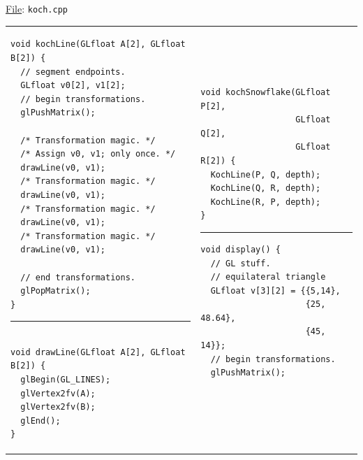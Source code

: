 \documentclass[addpoints]{exam}
\begin{document}
\begin{questions}
\underline{File}: {\tt koch.cpp}

\begin{table}
  \begin{tabular}{p{}|p{}}
    \begin{verbatim}
void kochLine(GLfloat A[2], GLfloat B[2]) {
  // segment endpoints.
  GLfloat v0[2], v1[2];
  // begin transformations.
  glPushMatrix();

  /* Transformation magic. */
  /* Assign v0, v1; only once. */    
  drawLine(v0, v1);
  /* Transformation magic. */
  drawLine(v0, v1);
  /* Transformation magic. */
  drawLine(v0, v1);
  /* Transformation magic. */
  drawLine(v0, v1);

  // end transformations.
  glPopMatrix();
}
\end{verbatim}
    \hrule
\begin{verbatim}

void drawLine(GLfloat A[2], GLfloat B[2]) {
  glBegin(GL_LINES);
  glVertex2fv(A);
  glVertex2fv(B);
  glEnd();
}
\end{verbatim}
    &
\begin{verbatim}
void kochSnowflake(GLfloat P[2],
                   GLfloat Q[2],
                   GLfloat R[2]) {
  KochLine(P, Q, depth);
  KochLine(Q, R, depth);
  KochLine(R, P, depth);
}
\end{verbatim}
      \hrule
\begin{verbatim}
void display() {
  // GL stuff.
  // equilateral triangle
  GLfloat v[3][2] = {{5,14},
                     {25, 48.64},
                     {45, 14}};
  // begin transformations.
  glPushMatrix();


\end{verbatim}
\end{tabular}
\end{table}
\end{questions}
\end{document}
